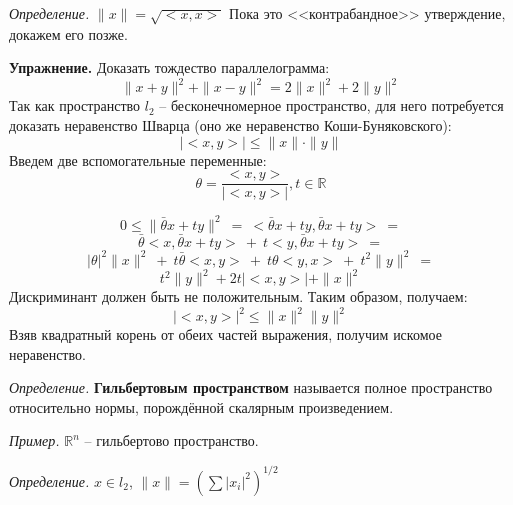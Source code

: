 \documentclass[12pt]{article}
\newcommand{\example}{{\itshape Пример. }}
\newcommand{\defi}{{\itshape Определение. }}
\newcommand{\exc}{{\bfseries Упражнение. }}
\renewcommand{\leq}{\leqslant}
\begin{document}
	\defi $\|x\| = \sqrt{<x, x>}$ {\color{gray} Пока это <<контрабандное>> утверждение, докажем его позже.}
	
	\exc Доказать тождество параллелограмма: 
	$$\|x+y\|^2 + \|x-y\|^2 = 2 \|x\|^2 + 2 \|y\|^2$$
	Так как пространство $l_2$ -- бесконечномерное пространство, для него потребуется доказать неравенство Шварца (оно же неравенство
	Коши-Буняковского):
	$$|<x, y>| \leq \|x\| \cdot \|y\|$$
	Введем две вспомогательные переменные:
	$$\theta = \frac{<x, y>}{|<x, y>|}, t \in \mathbb{R}$$
	
	$$0 \leq \|\bar{\theta} x + t y\|^2 ~=~ <\bar{\theta} x + t y, \bar{\theta} x + t y> ~= $$
	$$\bar{\theta} <x, \bar{\theta} x + t y> ~+~ t <y, \bar{\theta} x + t y> ~= $$
	$$|\theta|^2 \|x\|^2 ~+~ t \bar{\theta} <x, y> ~+~ t \theta <y, x> ~+~ t^2 \|y\|^2 ~= $$
	$$t^2 \|y\|^2 + 2t |<x,y>| + \|x\|^2$$
	Дискриминант должен быть не положительным. Таким образом, получаем:
	$$|<x, y>|^2 \leq \|x\|^2 \|y\|^2$$
	Взяв квадратный корень от обеих частей выражения, получим искомое неравенство.
	
	\defi \textbf{Гильбертовым пространством} называется полное пространство относительно нормы, порождённой скалярным произведением.
	
	\example $\mathbb{R}^n$ -- гильбертово пространство.
	
	\defi $x \in l_2$, $\|x\| = (\sum{|x_i|^2})^{1/2}$ 
\end{document}
